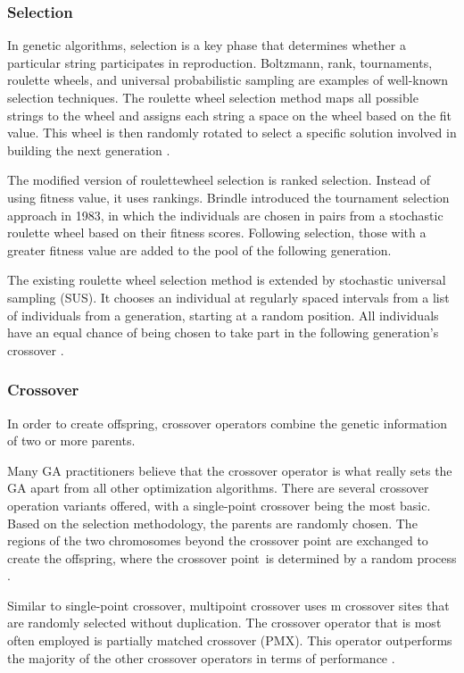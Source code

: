 \subsubsection{Selection}
In genetic algorithms, selection is a key phase that determines whether  a particular string participates in reproduction. Boltzmann, rank, tournaments, roulette wheels, and  universal probabilistic sampling are examples of well-known selection techniques. The roulette wheel selection method maps all possible strings to the wheel and assigns each string a space on the wheel  based on the fit value. This wheel is then randomly rotated to select a specific solution involved in building the next generation \citep{Holland} \citep{Katoch2021}. \par
The modified version of roulettewheel selection is ranked selection. Instead of using fitness value, it uses rankings. Brindle introduced the tournament selection approach in 1983, in which the individuals are chosen in pairs from a stochastic roulette wheel based on their fitness scores. Following selection, those with a greater fitness value are added to the pool of the following generation. \citep{Holland}\par
The existing roulette wheel selection method is extended by stochastic universal sampling (SUS). It chooses an individual at regularly spaced intervals from a list of individuals from a generation, starting at a random position. All individuals have an equal chance of being chosen to take part in the following generation's crossover \citep{Katoch2021}.

\subsubsection{Crossover}
In order to create offspring, crossover operators combine the genetic information of two or more parents.


Many GA practitioners believe that the crossover operator is what really sets the GA apart from all other optimization algorithms. There are several crossover operation variants offered, with a single-point crossover being the most basic. Based on the selection methodology, the parents are randomly chosen. The regions of the two chromosomes beyond the crossover point are exchanged to create the offspring, where the crossover point is determined by a random process \citep{Tang1996}.\par
Similar to single-point crossover, multipoint crossover uses m crossover sites that are randomly selected without duplication. The crossover operator that is most often employed is partially matched crossover (PMX). This operator outperforms the majority of the other crossover operators in terms of performance \citep{Katoch2021}.

